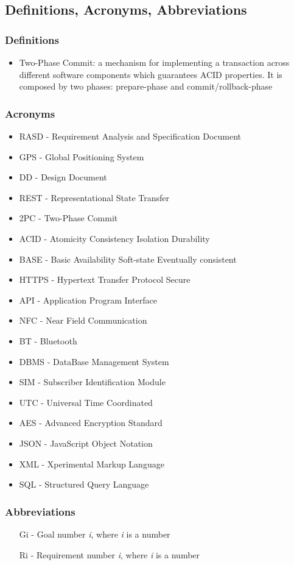 \subsection{Definitions, Acronyms, Abbreviations}

\subsubsection{Definitions}
\begin{itemize}
\item Two-Phase Commit: a mechanism for implementing a transaction across different software components which guarantees ACID properties. It is composed by two phases: prepare-phase and commit/rollback-phase

\end{itemize}

\subsubsection{Acronyms}
\begin{itemize}
\item RASD - Requirement Analysis and Specification Document
\item GPS - Global Positioning System
\item DD - Design Document
\item REST - Representational State Transfer
\item 2PC - Two-Phase Commit
\item ACID - Atomicity Consistency Isolation Durability
\item BASE - Basic Availability Soft-state Eventually consistent
\item HTTPS - Hypertext Transfer Protocol Secure
\item API - Application Program Interface
\item NFC - Near Field Communication
\item BT - Bluetooth
\item DBMS - DataBase Management System
\item SIM - Subscriber Identification Module
\item UTC - Universal Time Coordinated
\item AES - Advanced Encryption Standard
\item JSON - JavaScript Object Notation
\item XML - Xperimental Markup Language
\item SQL - Structured Query Language
\end{itemize}

\subsubsection{Abbreviations}
\begin{itemize}
\item [Gi] - Goal number \textit{i}, where \textit{i} is a number
\item [Ri] - Requirement number \textit{i}, where \textit{i} is a number
\end{itemize}
